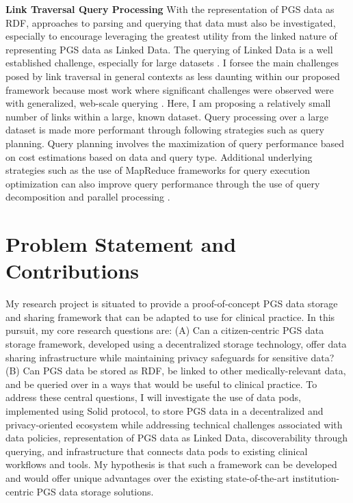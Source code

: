 \documentclass[runningheads]{llncs}
\begin{document}
\textbf{Link Traversal Query Processing}
With the representation of PGS data as RDF, approaches to parsing and querying that data must also be investigated, especially to encourage leveraging the greatest utility from the linked nature of representing PGS data as Linked Data.
The querying of Linked Data is a well established challenge, especially for large datasets \cite{taelman_evaluation_2023}.
I forsee the main challenges posed by link traversal in general contexts as less daunting within our proposed framework because most work where significant challenges were observed were with generalized, web-scale querying \cite{taelman_evaluation_2023}. 
Here, I am proposing a relatively small number of links within a large, known dataset. 
Query processing over a large dataset is made more performant through following strategies such as query planning.
Query planning involves the maximization of query performance based on cost estimations based on data and query type. 
Additional underlying strategies such as the use of MapReduce frameworks for query execution optimization can also improve query performance through the use of query decomposition and parallel processing \cite{shim_mapreduce_2013}.  


\section{Problem Statement and Contributions}

My research project is situated to provide a proof-of-concept PGS data storage and sharing framework that can be adapted to use for clinical practice. 
In this pursuit, my core research questions are: 
(A) Can a citizen-centric PGS data storage framework, developed using a decentralized storage technology, offer data sharing infrastructure while maintaining privacy safeguards for sensitive data? 
(B) Can PGS data be stored as RDF, be linked to other medically-relevant data, and be queried over in a ways that would be useful to clinical practice.
To address these central questions, I will investigate the use of data pods, implemented using Solid protocol, to store PGS data in a decentralized and privacy-oriented ecosystem while addressing technical challenges associated with data policies, representation of PGS data as Linked Data, discoverability through querying, and infrastructure that connects data pods to existing clinical workflows and tools. 
My hypothesis is that such a framework can be developed and would offer unique advantages over the existing state-of-the-art institution-centric PGS data storage solutions. 
\end{document}
